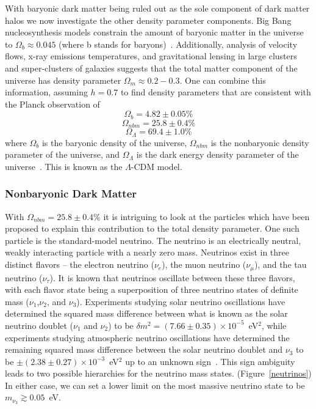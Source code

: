 With baryonic dark matter being ruled out as the sole component of dark matter halos we now investigate the other density parameter components. Big Bang nucleosynthesis models constrain the amount of baryonic matter in the universe to $\Omega_b \approx 0.045$ (where b stands for baryons)~\cite{Tytler}.  Additionally, analysis of velocity flows, x-ray emissions temperatures, and gravitational lensing in large clusters and super-clusters of galaxies suggests that the total matter component of the universe has density parameter $\Omega_m \approx 0.2-0.3$.  One can combine this information, assuming $h=0.7$ to find density parameters that are consistent with the Planck observation of
\[\Omega_b = 4.82 \pm 0.05\% \]
\[\Omega_{nbm} = 25.8 \pm 0.4\% \]
\[\Omega_\Lambda = 69.4 \pm 1.0\%\]
where $\Omega_b$ is the baryonic density of the universe, $\Omega_{nbm}$ is the nonbaryonic density parameter of the universe, and $\Omega_\Lambda$ is the dark energy density parameter of the universe~\cite{Spergel,Planck}. This is known as the $\Lambda$-CDM model. 

\subsubsection{Nonbaryonic Dark Matter}

With $\Omega_{nbm} = 25.8 \pm 0.4\% $ it is intriguing to look at the particles which have been proposed to explain this contribution to the total density parameter. One such particle is the standard-model neutrino.  The neutrino is an electrically neutral, weakly interacting particle with a nearly zero mass.  Neutrinos exist in three distinct flavors -- the electron neutrino ($\nu_e$), the muon neutrino ($\nu_\mu$), and the tau neutrino ($\nu_\tau$).  It is known that neutrinos oscillate between these three flavors, with each flavor state being a superposition of three neutrino states of definite mass ($\nu_1$,$\nu_2$, and $\nu_3$).  Experiments studying solar neutrino oscillations have determined the squared mass difference between what is known as the solar neutrino doublet ($\nu_1$ and $\nu_2$) to be $\delta m^2 = (7.66 \pm 0.35) \times 10^{-5}$~eV$^2$, while experiments studying atmospheric neutrino oscillations have determined the remaining squared mass difference between the solar neutrino doublet and $\nu_3$ to be $\pm (2.38 \pm 0.27) \times 10^{-3}$~eV$^2$ up to an unknown sign~\cite{Robertson}.  This sign ambiguity leads to two possible hierarchies for the neutrino mass states. (Figure~\ref{neutrinos})  In either case, we can set a lower limit on the most massive neutrino state to be $ m_{\nu_3} \gtrsim 0.05$~eV.

